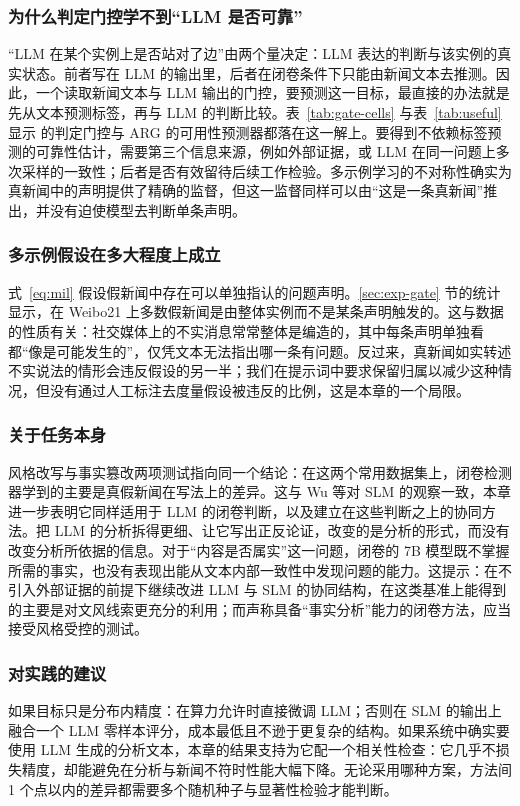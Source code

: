 \subsubsection{为什么判定门控学不到“LLM 是否可靠”}
“LLM 在某个实例上是否站对了边”由两个量决定：LLM 表达的判断与该实例的真实状态。前者写在 LLM 的输出里，后者在闭卷条件下只能由新闻文本去推测。因此，一个读取新闻文本与 LLM 输出的门控，要预测这一目标，最直接的办法就是先从文本预测标签，再与 LLM 的判断比较。表~\ref{tab:gate-cells} 与表~\ref{tab:useful} 显示 \method{} 的判定门控与 ARG 的可用性预测器都落在这一解上。要得到不依赖标签预测的可靠性估计，需要第三个信息来源，例如外部证据，或 LLM 在同一问题上多次采样的一致性；后者是否有效留待后续工作检验。多示例学习的不对称性确实为真新闻中的声明提供了精确的监督，但这一监督同样可以由“这是一条真新闻”推出，并没有迫使模型去判断单条声明。

\subsubsection{多示例假设在多大程度上成立}
式~\eqref{eq:mil} 假设假新闻中存在可以单独指认的问题声明。\ref{sec:exp-gate} 节的统计显示，在 Weibo21 上多数假新闻是由整体实例而不是某条声明触发的。这与数据的性质有关：社交媒体上的不实消息常常整体是编造的，其中每条声明单独看都“像是可能发生的”，仅凭文本无法指出哪一条有问题。反过来，真新闻如实转述不实说法的情形会违反假设的另一半；我们在提示词中要求保留归属以减少这种情况，但没有通过人工标注去度量假设被违反的比例，这是本章的一个局限。

\subsubsection{关于任务本身}
风格改写与事实篡改两项测试指向同一个结论：在这两个常用数据集上，闭卷检测器学到的主要是真假新闻在写法上的差异。这与 Wu 等\citep{wu2024sheepdog}对 SLM 的观察一致，本章进一步表明它同样适用于 LLM 的闭卷判断，以及建立在这些判断之上的协同方法。把 LLM 的分析拆得更细、让它写出正反论证，改变的是分析的形式，而没有改变分析所依据的信息。对于“内容是否属实”这一问题，闭卷的 7B 模型既不掌握所需的事实，也没有表现出能从文本内部一致性中发现问题的能力。这提示：在不引入外部证据的前提下继续改进 LLM 与 SLM 的协同结构，在这类基准上能得到的主要是对文风线索更充分的利用；而声称具备“事实分析”能力的闭卷方法，应当接受风格受控的测试。

\subsubsection{对实践的建议}
如果目标只是分布内精度：在算力允许时直接微调 LLM；否则在 SLM 的输出上融合一个 LLM 零样本评分，成本最低且不逊于更复杂的结构。如果系统中确实要使用 LLM 生成的分析文本，本章的结果支持为它配一个相关性检查：它几乎不损失精度，却能避免在分析与新闻不符时性能大幅下降。无论采用哪种方案，方法间 1 个点以内的差异都需要多个随机种子与显著性检验才能判断。

